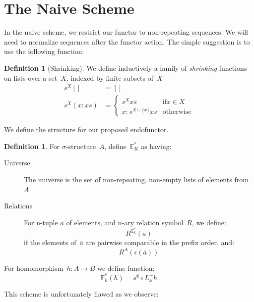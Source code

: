 \documentclass{article}
\theoremstyle{plain}
\theoremstyle{definition}
\newtheorem{definition}[theorem]{Definition}
\theoremstyle{remark}
\numberwithin{theorem}{section}
\begin{document}
\section{The Naive Scheme}
\label{sec:naive}
In the naive scheme, we restrict our functor to non-repeating sequences. We will need to normalize sequences after the functor action. The simple suggestion is to use the following function:
\begin{definition}[Shrinking]
\label{def:shrinking}
We define inductively a family of \emph{shrinking} functions on lists over a set~$X$, indexed by finite subsets of~$X$
\begin{align*}
    s^X [] &= []\\
    s^X (x:xs) &=
    \begin{cases}
    s^X xs &\mbox{if} x \in X\\
    x : s^{X \cup \{ x \}} xs &\mbox{otherwise}
    \end{cases}
\end{align*}
\end{definition}
We define the structure for our proposed endofunctor.
\begin{definition}
For $\sigma$-structure~$A$, define~$\mathbb{E}^*_K$ as having:
\begin{description}
\item[Universe] The universe is the set of non-repeating, non-empty lists of elements from~$A$.
\item[Relations] For n-tuple $\overline{a}$ of elements, and n-ary relation symbol~$R$, we define:
\begin{equation*}
    R^{\mathbb{E}^*_k}(\overline{a})
\end{equation*}
if the elements of~$\overline{a}$ are pairwise comparable in the prefix order, and:
\begin{equation*}
    R^A(\epsilon(\overline{a}))
\end{equation*}
\end{description}
For homomorphism~$h : A \rightarrow B$ we define function:
\begin{equation*}
    \mathbb{E}^*_k(h) = s^\emptyset \circ L^+_k h
\end{equation*}
\end{definition}
This scheme is unfortunately flawed as we observe:
\end{document}
